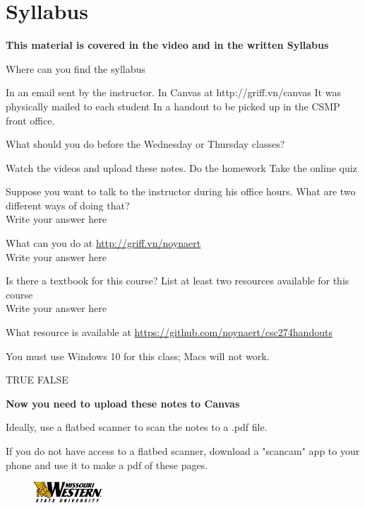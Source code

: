 \documentclass[letterpaper,12pt]{exam}
\begin{document}
\section*{Syllabus}
\begin{center}
	\textbf{This material is covered in the video and in the written Syllabus}
\end{center}
\begin{questions}
	\question Where can you find the syllabus
	\begin{checkboxes}
	\choice In an email sent by the instructor.
	\choice In Canvas at http://griff.vn/canvas
	\choice It was physically mailed to each student
	\choice In a handout to be picked up in the CSMP front office.
	\end{checkboxes}


	\question What should you do before the Wednesday or Thursday classes?
	\begin{checkboxes}
	\choice Watch the videos and upload these notes.
	\choice Do the homework
	\choice Take the online quiz
	\end{checkboxes}

	\question Suppose you want to talk to the instructor during his office hours.  What are two different ways of doing that?
	\\{\color{blue} Write your answer here }
	\vspace{1.5cm}

	\question What can you do at \url{http://griff.vn/noynaert }
	\\{\color{blue} Write your answer here }
	\vspace{1.5cm}

	\question Is there a textbook for this course? List at least two resources available for this course 
	\\{\color{blue} Write your answer here }
	\vspace{1.5cm}

	\question What resource is available at  \url{https://github.com/noynaert/csc274handouts}
	\vspace{1.5cm}

	\question You must use Windows 10 for this class; Macs will not work.
	\begin{checkboxes}
	\choice TRUE
	\choice FALSE

	\end{checkboxes}

\end{questions}
\vspace{1cm}
\begin{center}
	\textbf{Now you need to upload these notes to Canvas}

	Ideally, use a flatbed scanner to scan the notes to a .pdf file.

	If you do not have access to a flatbed scanner, download a "scancam" app to your phone and use it to make a pdf of these pages.
\end{center}
\vspace{1cm}

\begin{figure}[b]\label{end}
	\center
	\includegraphics[width=1in]{tux}
\end{figure}
\end{document}
